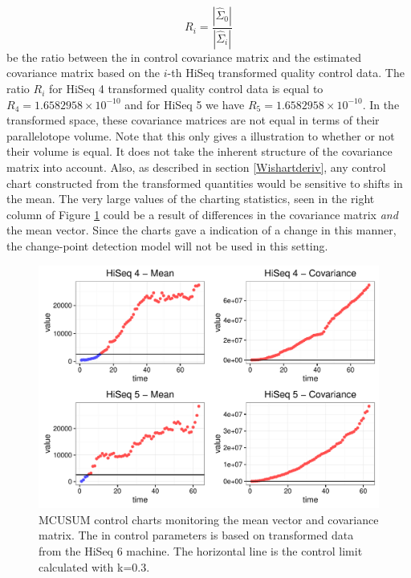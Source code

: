 \documentclass[a4paper,11pt,fleqn,twoside,notitlepage]{report}\usepackage[]{graphicx}\usepackage[]{color}
\makeatletter
\def\maxwidth{ %
  \ifdim\Gin@nat@width>\linewidth
    \linewidth
  \else
    \Gin@nat@width
  \fi
}
\newenvironment{knitrout}{}{} %
\makeatother
\begin{document}
$$
R_{i} = \frac{|\widehat{\Sigma}_0|}{|\widehat{\Sigma}_i|}
$$
be the ratio between the in control covariance matrix and the estimated covariance matrix based on the $i$-th HiSeq transformed quality control data. The ratio $R_{i}$ for HiSeq 4 transformed quality control data is equal to $R_{4}=\ensuremath{1.6582958\times 10^{-10}}$ and for HiSeq 5 we have $R_{5}=\ensuremath{1.6582958\times 10^{-10}}$. In the transformed space, these covariance matrices are not equal in terms of their parallelotope volume. Note that this only gives a illustration to whether or not their volume is equal. It does not take the inherent structure of the covariance matrix into account. Also, as described in section \ref{Wishartderiv}, any control chart constructed from the transformed quantities would be sensitive to shifts in the mean. The very large values of the charting statistics, seen in the right column of Figure \ref{fig:HiSeq45MCUSUMfig} could be a result of differences in the covariance matrix \textit{and} the mean vector. Since the charts gave a indication of a change in this manner, the change-point detection model will not be used in this setting.


\begin{knitrout}
\color{fgcolor}\begin{figure}[!ht]
\includegraphics[width=\maxwidth]{figure/HiSeq45MCUSUMfig-1} \caption[MCUSUM control charts monitoring the mean vector and covariance matrix]{MCUSUM control charts monitoring the mean vector and covariance matrix. The in control parameters is based on transformed data from the HiSeq 6 machine. The horizontal line is the control limit calculated with k=0.3.}\label{fig:HiSeq45MCUSUMfig}
\end{figure}


\end{knitrout}
\end{document}
